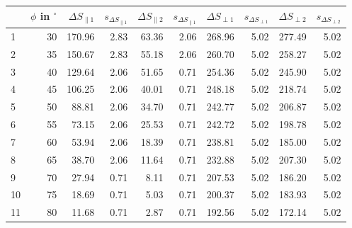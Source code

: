 \begin{table}[h]
    \centering
    \captionsetup{justification=centering,margin=2cm}
    \begin{tabular}{lrrrrrrrrr}
        \toprule
        {} &  $\phi$ in $^{\circ}$   &  $\Delta S_{\parallel 1}$ &  $s_{\Delta S_{\parallel 1}}$ &  $\Delta S_{\parallel 2}$ &  $s_{\Delta S_{\parallel 1}}$ &  $\Delta S_{\perp  1}$ &  $s_{\Delta S_{\perp  1}}$ & $\Delta S_{\perp  2}$ &   $s_{\Delta S_{\perp 2}}$ \\
        \midrule
        1  &        30 &        170.96 &            2.83 &         63.36 &            2.06 &        268.96 &            5.02 &        277.49 &            5.02 \\
    2  &        35 &        150.67 &            2.83 &         55.18 &            2.06 &        260.70 &            5.02 &        258.27 &            5.02 \\
    3  &        40 &        129.64 &            2.06 &         51.65 &            0.71 &        254.36 &            5.02 &        245.90 &            5.02 \\
    4  &        45 &        106.25 &            2.06 &         40.01 &            0.71 &        248.18 &            5.02 &        218.74 &            5.02 \\
    5  &        50 &         88.81 &            2.06 &         34.70 &            0.71 &        242.77 &            5.02 &        206.87 &            5.02 \\
    6  &        55 &         73.15 &            2.06 &         25.53 &            0.71 &        242.72 &            5.02 &        198.78 &            5.02 \\
    7  &        60 &         53.94 &            2.06 &         18.39 &            0.71 &        238.81 &            5.02 &        185.00 &            5.02 \\
    8  &        65 &         38.70 &            2.06 &         11.64 &            0.71 &        232.88 &            5.02 &        207.30 &            5.02 \\
    9  &        70 &         27.94 &            0.71 &          8.11 &            0.71 &        207.53 &            5.02 &        186.20 &            5.02 \\
    10 &        75 &         18.69 &            0.71 &          5.03 &            0.71 &        200.37 &            5.02 &        183.93 &            5.02 \\
    11 &        80 &         11.68 &            0.71 &          2.87 &            0.71 &        192.56 &            5.02 &        172.14 &            5.02 \\

\end{tabular}
\end{table}
